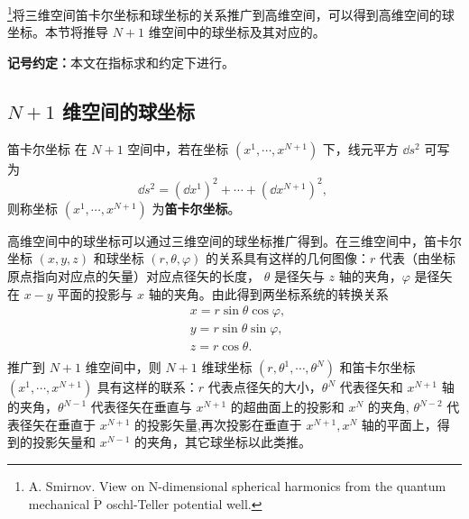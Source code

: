 
\footnote{A. Smirnov. View on N-dimensional spherical harmonics from
 the quantum mechanical $\ddot{\mathrm P}$ oschl-Teller potential
 well.
 }将三维空间笛卡尔坐标和球坐标的关系推广到高维空间，可以得到高维空间的球坐标。本节将推导 $N+1$ 维空间中的球坐标及其对应的。

\textbf{记号约定：}本文在指标求和约定下进行。

\subsection{$N+1$ 维空间的球坐标}
\begin{definition}{笛卡尔坐标}\label{def_nDSM_1}
在 $N+1$ 空间中，若在坐标 $(x^1,\cdots,x^{N+1})$ 下，线元平方 $\dd s^2$ 可写为
\begin{equation}\label{eq_nDSM_2}
\dd s^2=(\dd x^1)^2+\cdots+(\dd x^{N+1})^2,~
\end{equation}
 则称坐标 $(x^1,\cdots,x^{N+1})$ 为\textbf{笛卡尔坐标}。
\end{definition}

高维空间中的球坐标可以通过三维空间的球坐标推广得到。在三维空间中，笛卡尔坐标 $(x,y,z)$ 和球坐标 $(r,\theta,\varphi)$ 的关系具有这样的几何图像：$r$ 代表（由坐标原点指向对应点的矢量）对应点径矢的长度， $\theta$ 是径矢与 $z$ 轴的夹角，$\varphi$ 是径矢在 $x-y$ 平面的投影与 $x$ 轴的夹角。由此得到两坐标系统的转换关系
\begin{equation}
\begin{aligned}
&x=r\sin\theta\cos\varphi,\\
&y=r\sin\theta\sin\varphi,\\
&z=r\cos\theta.\\
\end{aligned}~
\end{equation}
推广到 $N+1$ 维空间中，则 $N+1$ 维球坐标 $(r,\theta^1,\cdots,\theta^{N})$ 和笛卡尔坐标 $(x^1,\cdots,x^{N+1})$ 具有这样的联系：$r$ 代表点径矢的大小，$\theta^{N}$ 代表径矢和 $x^{N+1}$ 轴的夹角，$\theta^{N-1}$ 代表径矢在垂直与 $x^{N+1}$ 的超曲面上的投影和 $x^{N}$ 的夹角, $\theta^{N-2}$ 代表径矢在垂直于 $x^{N+1}$ 的投影矢量,再次投影在垂直于 $x^{N+1},x^{N}$ 轴的平面上，得到的投影矢量和 $x^{N-1}$ 的夹角，其它球坐标以此类推。

